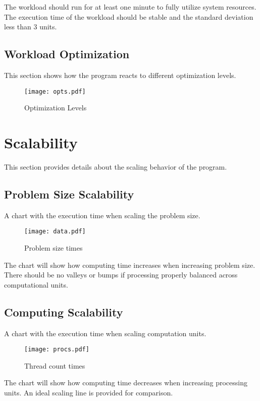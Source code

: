 \documentclass[a4paper]{article}
\begin{document}
The workload should run for at least one minute to fully utilize system resources. The execution time of the workload should be stable and the standard deviation less than 3 units.

\subsection{Workload Optimization}

This section shows how the program reacts to different optimization levels.

\begin{figure}[H]
\label{fig:optimizations}
\centering
\texttt{[image: opts.pdf]}
\caption{Optimization Levels}
\end{figure}

\section{Scalability}

This section provides details about the scaling behavior of the program.

\subsection{Problem Size Scalability}

A chart with the execution time when scaling the problem size.

\begin{figure}[H]
\label{fig:scaling}
\centering
\texttt{[image: data.pdf]}
\caption{Problem size times}
\end{figure}

The chart will show how computing time increases when increasing problem size.
There should be no valleys or bumps if processing properly balanced across computational units.

\subsection{Computing Scalability}

A chart with the execution time when scaling computation units.

\begin{figure}[H]
\label{fig:threads}
\centering
\texttt{[image: procs.pdf]}
\caption{Thread count times}
\end{figure}

The chart will show how computing time decreases when increasing processing units.
An ideal scaling line is provided for comparison.
\end{document}
